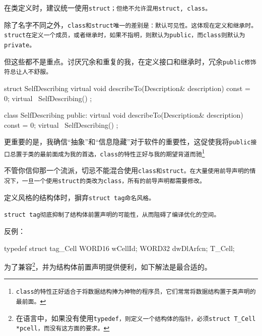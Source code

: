 \begin{content}

\begin{regulation}
在类定义时，建议统一使用\tt{struct}；但绝不允许混用\tt{struct, class}。
\end{regulation}

除了名字不同之外，\tt{class}和\tt{struct}唯一的差别是：默认可见性。这体现在定义和继承时。\tt{struct}在定义一个成员，或者继承时，如果不指明，则默认为\tt{public}，而\tt{class}则默认为\tt{private}。

但这些都不是重点。讨厌冗余和重复的我，在定义接口和继承时，冗余\tt{public}修饰符总让人不舒服。

\begin{leftbar}
\begin{c++}
struct SelfDescribing
{
    virtual void describeTo(Description& description) const = 0;
    virtual ~SelfDescribing() {}
};

class SelfDescribing
{
public:
    virtual void describeTo(Description& description) const = 0;
    virtual ~SelfDescribing() {}
};
\end{c++}
\end{leftbar}

更重要的是，我确信“抽象”和“信息隐藏”对于软件的重要性，这促使我将\tt{public}接口总置于类的最前面成为我的首选，\tt{class}的特性正好与我的期望背道而驰\footnote{\tt{class}的特性正好适合于将数据结构捧为神物的程序员，它们常常将数据结构置于类声明的最前面。}

不管你信仰那一个流派，切忌不能混合使用\tt{class}和\tt{struct}。在大量使用前导声明的情况下，一旦一个使用\tt{struct}的类改为\tt{class}，所有的前导声明都需要修改。

\begin{regulation}
定义\clang{}风格的结构体时，摒弃\tt{struct tag}命名风格。
\end{regulation}

\tt{struct tag}彻底抑制了结构体前置声明的可能性，从而阻碍了编译优化的空间。

反例：
\begin{leftbar}
\begin{c++}
typedef struct tag_Cell
{
    WORD16 wCellId;
    WORD32 dwDlArfcn;
} T_Cell;
\end{c++}
\end{leftbar}

为了兼容\clang{}\footnote{在\clang{}语言中，如果没有使用\tt{typedef}，则定义一个结构体的指针，必须\tt{struct T\_Cell *pcell}，而\cpp{}没有这方面的要求。}，并为结构体前置声明提供便利，如下解法是最合适的。


\end{content}
